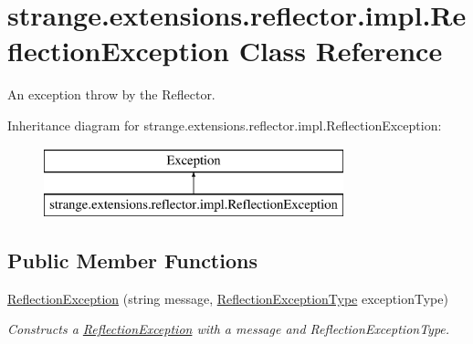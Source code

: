 \hypertarget{classstrange_1_1extensions_1_1reflector_1_1impl_1_1_reflection_exception}{\section{strange.\-extensions.\-reflector.\-impl.\-Reflection\-Exception Class Reference}
\label{classstrange_1_1extensions_1_1reflector_1_1impl_1_1_reflection_exception}
}


An exception throw by the Reflector.  


Inheritance diagram for strange.\-extensions.\-reflector.\-impl.\-Reflection\-Exception\-:\begin{figure}[H]
\begin{center}
\leavevmode
\includegraphics[height=2.000000cm]{classstrange_1_1extensions_1_1reflector_1_1impl_1_1_reflection_exception}
\end{center}
\end{figure}
\subsection*{Public Member Functions}
\begin{DoxyCompactItemize}
\item 
\hypertarget{classstrange_1_1extensions_1_1reflector_1_1impl_1_1_reflection_exception_a9175ff4dec7b3044665a213353072198}{\hyperlink{classstrange_1_1extensions_1_1reflector_1_1impl_1_1_reflection_exception_a9175ff4dec7b3044665a213353072198}{Reflection\-Exception} (string message, \hyperlink{namespacestrange_1_1extensions_1_1reflector_1_1api_a4470d7d3edf61dfa229aec6e9a914159}{Reflection\-Exception\-Type} exception\-Type)}\label{classstrange_1_1extensions_1_1reflector_1_1impl_1_1_reflection_exception_a9175ff4dec7b3044665a213353072198}

\begin{DoxyCompactList}\small\item\em Constructs a \hyperlink{classstrange_1_1extensions_1_1reflector_1_1impl_1_1_reflection_exception}{Reflection\-Exception} with a message and Reflection\-Exception\-Type. \end{DoxyCompactList}\end{DoxyCompactItemize}
